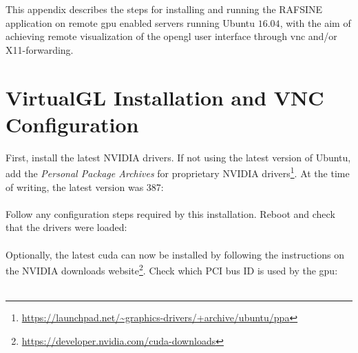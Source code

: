 This appendix describes the steps for installing and running the RAFSINE application on remote \gls{gpu} enabled servers running Ubuntu $16.04$, with the aim of achieving remote visualization of the \gls{opengl} user interface through \gls{vnc} and/or X11-forwarding.

\section{VirtualGL Installation and VNC Configuration}\label{app:virtualgl_install}
First, install the latest NVIDIA drivers. If not using the latest version of Ubuntu, add the \textit{Personal Package Archives} for proprietary NVIDIA drivers\footnote{\url{https://launchpad.net/~graphics-drivers/+archive/ubuntu/ppa}}. At the time of writing, the latest version was 387:\\[\baselineskip]
\\[\baselineskip]
Follow any configuration steps required by this installation. Reboot and check that the drivers were loaded:\\[\baselineskip]
\\[\baselineskip]
Optionally, the latest \gls{cuda} can now be installed by following the instructions on the NVIDIA downloads website\footnote{\url{https://developer.nvidia.com/cuda-downloads}}. Check which PCI bus ID is used by the \gls{gpu}:\\[\baselineskip]
\\[\baselineskip]
